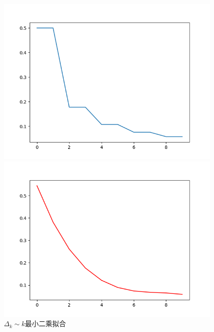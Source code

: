 \begin{figure}[htbp]
    \centering

    {
        \begin{minipage}[b]{.9\linewidth}
            \centering
            \includegraphics[scale=0.5]{pic/1/2_delta_k.png}
        \end{minipage}
    }


    \caption{$\Delta_k \sim k$}
    \centering

    {
        \begin{minipage}[b]{.9\linewidth}
            \centering
            \includegraphics[scale=0.5]{pic/1/curve_fit.png}
        \end{minipage}
    }


    \caption{$\Delta_k \sim k$最小二乘拟合}
\end{figure}


